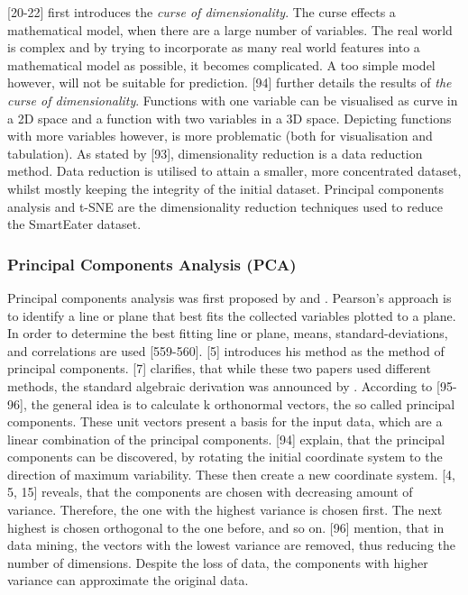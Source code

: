 
\textcite{bellman1957dynamic}[20-22] first introduces the \textit{curse of dimensionality}. The curse effects a mathematical model, when there are a large number of variables. The real world is complex and by trying to incorporate as many real world features into a mathematical model as possible, it becomes complicated. A too simple model however, will not be suitable for prediction. 
\textcite{bellman1961adaptive}[94] further details the results of \textit{the curse of dimensionality}. Functions with one variable can be visualised as curve in a 2D space and a function with two variables in a 3D space. Depicting functions with more variables however, is more problematic (both for visualisation and tabulation). As stated by \textcite{han2011data}[93], dimensionality reduction is a data reduction method. Data reduction is utilised to attain a smaller, more concentrated dataset, whilst mostly keeping the integrity of the initial dataset. Principal components analysis and t-SNE are the dimensionality reduction techniques used to reduce the SmartEater dataset.


\subsubsection{Principal Components Analysis (PCA)}
Principal components analysis was first proposed by \textcite{OnLinesAndPlanes1901} and \textcite{hotelling1933analysis}.
Pearson's approach is to identify a line or plane that best fits the collected variables plotted to a plane. In order to determine the best fitting line or plane, means, standard-deviations, and correlations are used \autocite{OnLinesAndPlanes1901}[559-560].
\textcite{hotelling1933analysis}[5] introduces his method as the method of principal components. \textcite{jolliffe2002PCA}[7] clarifies, that while these two papers used different methods, the standard algebraic
derivation was announced by \textcite{hotelling1933analysis}. According to \textcite{han2011data}[95-96], the general idea is to calculate k orthonormal vectors, the so called principal components. These unit vectors present a basis for the input data, which are a linear combination of the principal components. \textcite{DataMiningAndPredictiveAnalytics}[94] explain, that the principal components can be discovered, by rotating the initial coordinate system to the direction of maximum variability. These then create a new coordinate system. \textcite{hotelling1933analysis}[4, 5, 15] reveals, that the components are chosen with decreasing amount of variance. Therefore, the one with the highest variance is chosen first. The next highest is chosen orthogonal to the one before, and so on. \textcite{han2011data}[96] mention, that in data mining, the vectors with the lowest variance are removed, thus reducing the number of dimensions. Despite the loss of data, the components with higher variance can approximate the original data.


